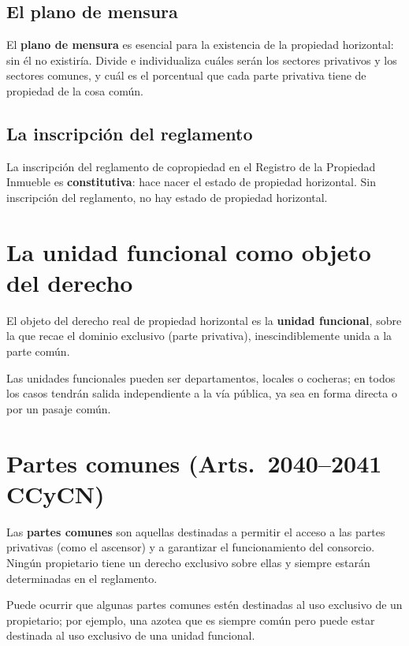 \documentclass[12pt,oneside]{book}
\begin{document}
\subsection{El plano de mensura}

El \textbf{plano de mensura} es esencial para la existencia de la propiedad horizontal: sin él no existiría. Divide e individualiza cuáles serán los sectores privativos y los sectores comunes, y cuál es el porcentual que cada parte privativa tiene de propiedad de la cosa común.

\subsection{La inscripción del reglamento}

La inscripción del reglamento de copropiedad en el Registro de la Propiedad Inmueble es \textbf{constitutiva}: hace nacer el estado de propiedad horizontal. Sin inscripción del reglamento, no hay estado de propiedad horizontal.

\section{La unidad funcional como objeto del derecho}

El objeto del derecho real de propiedad horizontal es la \textbf{unidad funcional}, sobre la que recae el dominio exclusivo (parte privativa), inescindiblemente unida a la parte común.

Las unidades funcionales pueden ser departamentos, locales o cocheras; en todos los casos tendrán salida independiente a la vía pública, ya sea en forma directa o por un pasaje común.

\section{Partes comunes (Arts.~2040--2041 CCyCN)}

Las \textbf{partes comunes} son aquellas destinadas a permitir el acceso a las partes privativas (como el ascensor) y a garantizar el funcionamiento del consorcio. Ningún propietario tiene un derecho exclusivo sobre ellas y siempre estarán determinadas en el reglamento.

Puede ocurrir que algunas partes comunes estén destinadas al uso exclusivo de un propietario; por ejemplo, una azotea que es siempre común pero puede estar destinada al uso exclusivo de una unidad funcional.
\end{document}
